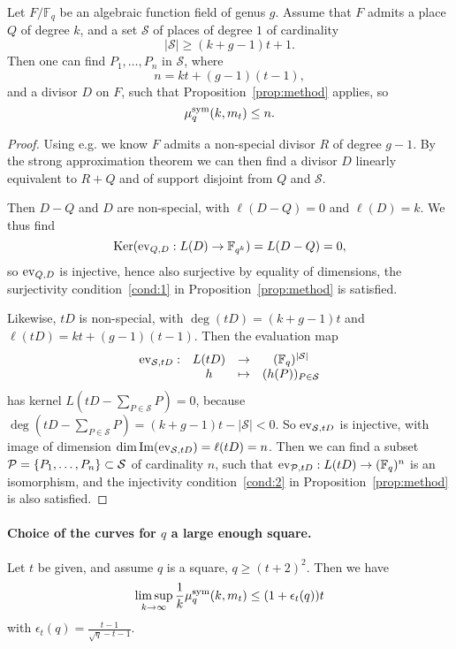 \documentclass[11pt]{article}
\begin{document}
\begin{prop}
\label{prop:numerical}
Let $F/\mathbb{F}_{q}$ be an algebraic function field of genus $g$.
Assume that $F$ admits a place $Q$ of degree $k$, and a set $\mathcal{S}$ of places of degree $1$ of cardinality
\[
  |\mathcal{S}|\geq (k+g-1)t+1.
\]
Then one can find $P_1,\dots,P_n$ in $\mathcal{S}$, where
\[
  n = kt+(g-1)(t-1),
\]
and a divisor $D$ on $F$, such that Proposition~\ref{prop:method} applies, so
\[ \mu^{\textrm{sym}}_q(k,m_t)\leq n. \]
\end{prop}
\begin{proof}
Using e.g. \cite[Lemma~2.1]{Ballet99} we know $F$ admits a non-special divisor $R$ of degree $g-1$.
By the strong approximation theorem \cite[Thm.~1.6.5]{Stichtenoth09}
we can then find a divisor $D$ linearly equivalent to $R+Q$ and of support disjoint from $Q$ and $\mathcal{S}$.

Then $D-Q$ and $D$ are non-special, with $\ell(D-Q)=0$ and $\ell(D)=k$.
We thus find
\[
  \operatorname{Ker}(\operatorname{ev}_{Q, D}:L(D)\to\mathbb{F}_{q^k}) = L(D-Q) = 0,
\]
so $\operatorname{ev}_{Q, D}$ is injective, hence also surjective by equality of dimensions,
\ie the surjectivity condition~\ref{cond:1} in Proposition~\ref{prop:method} is satisfied.

Likewise, $tD$ is non-special, with $\deg(tD)=(k+g-1)t$ and $\ell(tD)=kt+(g-1)(t-1)$.
Then the evaluation map
\[
\begin{array}{cccc}
\operatorname{ev}_{\mathcal{S}, tD}: & L(tD) & \to & (\mathbb{F}_{q})^{|\mathcal{S}|}\\
  & h & \mapsto & (h(P))_{P\in\mathcal{S}}
\end{array}
\]
has kernel $L(tD-\sum_{P\in\mathcal{S}}P)=0$, because $\deg(tD-\sum_{P\in\mathcal{S}}P)=(k+g-1)t-|\mathcal{S}|<0$.
So $\operatorname{ev}_{\mathcal{S}, tD}$ is injective, with image of dimension $\dim\operatorname{Im}(\operatorname{ev}_{\mathcal{S}, tD})=\ell(tD)=n$.
Then we can find a subset $\mathcal{P}=\{P_1,\dots,P_n\}\subset\mathcal{S}$ of cardinality $n$,
such that $\operatorname{ev}_{\mathcal{P}, tD}: L(tD) \to (\mathbb{F}_{q})^n$ is an isomorphism,
and the injectivity condition~\ref{cond:2} in Proposition~\ref{prop:method} is also satisfied.
\end{proof}

\paragraph{Choice of the curves for $q$ a large enough square.}

\begin{prop}
Let $t$ be given, and assume $q$ is a square, $q\geq(t+2)^2$.
Then we have
\[
\limsup_{k\to\infty}\frac{1}{k}\mu^{\textrm{sym}}_q(k,m_t)\leq(1+\epsilon_t(q))t
\]
with $\epsilon_t(q)=\frac{t-1}{\sqrt{q}-t-1}$.
\end{prop}
\end{document}
